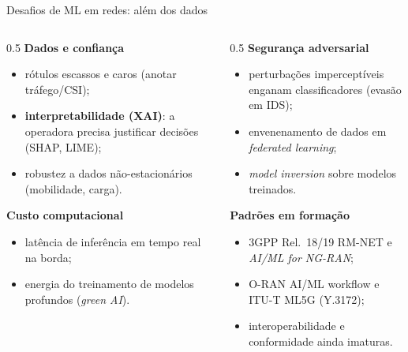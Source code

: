 \documentclass[aspectratio=169,11pt]{beamer}
\begin{document}
\begin{frame}{Desafios de ML em redes: além dos dados}
  \begin{columns}
    \begin{column}{0.5\textwidth}
      \textbf{Dados e confiança}
      \begin{itemize}
        \item rótulos escassos e caros (anotar tráfego/CSI);
        \item \textbf{interpretabilidade (XAI)}: a operadora precisa justificar decisões (SHAP, LIME);
        \item robustez a dados não-estacionários (mobilidade, carga).
      \end{itemize}
      \textbf{Custo computacional}
      \begin{itemize}
        \item latência de inferência em tempo real na borda;
        \item energia do treinamento de modelos profundos (\emph{green AI}).
      \end{itemize}
    \end{column}
    \begin{column}{0.5\textwidth}
      \textbf{Segurança adversarial}
      \begin{itemize}
        \item perturbações imperceptíveis enganam classificadores (evasão em IDS);
        \item envenenamento de dados em \emph{federated learning};
        \item \emph{model inversion} sobre modelos treinados.
      \end{itemize}
      \textbf{Padrões em formação}
      \begin{itemize}
        \item 3GPP Rel.\ 18/19 RM-NET e \emph{AI/ML for NG-RAN};
        \item O-RAN AI/ML workflow e ITU-T ML5G (Y.3172);
        \item interoperabilidade e conformidade ainda imaturas.
      \end{itemize}
    \end{column}
  \end{columns}
\end{frame}
\end{document}
